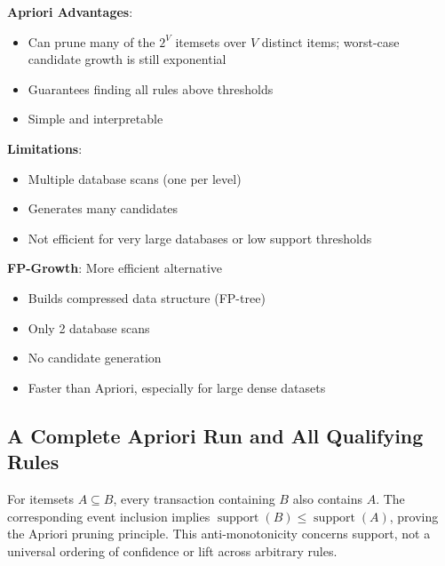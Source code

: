 \documentclass[11pt,twoside]{article}
\numberwithin{equation}{section}
\theoremstyle{plain}
\theoremstyle{definition}
\theoremstyle{remark}
\newenvironment{keyidea}{
  \begin{tcolorbox}[colback=yellow!5!white,
                    colframe=yellow!50!black,
                    title=Key Idea,
                    breakable,
                    enhanced,
                    sharp corners,
                    boxrule=0.8pt,
                    left=6pt, right=6pt, top=6pt, bottom=6pt]
}{
  \end{tcolorbox}
}
\begin{document}
\begin{keyidea}
\textbf{Apriori Advantages}:
\begin{itemize}
\item Can prune many of the $2^V$ itemsets over $V$ distinct items; worst-case candidate growth is still exponential
\item Guarantees finding all rules above thresholds
\item Simple and interpretable
\end{itemize}

\textbf{Limitations}:
\begin{itemize}
\item Multiple database scans (one per level)
\item Generates many candidates
\item Not efficient for very large databases or low support thresholds
\end{itemize}

\textbf{FP-Growth}: More efficient alternative
\begin{itemize}
\item Builds compressed data structure (FP-tree)
\item Only 2 database scans
\item No candidate generation
\item Faster than Apriori, especially for large dense datasets
\end{itemize}
\end{keyidea}

\subsection{A Complete Apriori Run and All Qualifying Rules}
For itemsets $A\subseteq B$, every transaction containing $B$ also contains $A$. The corresponding event inclusion implies $\operatorname{support}(B)\le\operatorname{support}(A)$, proving the Apriori pruning principle. This anti-monotonicity concerns support, not a universal ordering of confidence or lift across arbitrary rules.
\end{document}
